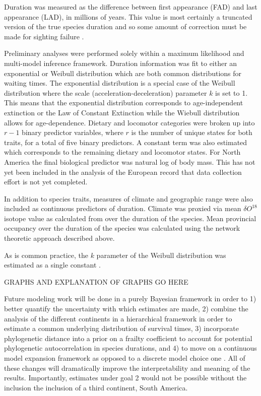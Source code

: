 \documentclass[11pt,letterpaper]{article}
\begin{document}
Duration was measured as the difference between first appearance (FAD) and last appearance (LAD), in millions of years. This value is most certainly a truncated version of the true species duration and so some amount of correction must be made for sighting failure \citep{Alroy2014a,Solow1997,Strauss1989}. %

Preliminary analyses were performed solely within a maximum likelihood and multi-model inference framework. Duration information was fit to either an exponential or Weibull distribution which are both common distributions for waiting times. The exponential distribution is a special case of the Weibull distribution where the scale (acceleration-deceleration) parameter \(k\) is set to 1. This means that the exponential distribution corresponds to age-independent extinction or the Law of Constant Extinction \citep{VanValen1973} while the Wiebull distribution allows for age-dependence. Dietary and locomotor categories were broken up into \(r - 1\) binary predictor variables, where \(r\) is the number of unique states for both traits, for a total of five binary predictors. A constant term was also estimated which corresponds to the remaining dietary and locomotor states. For North America the final biological predictor was natural log of body mass. This has not yet been included in the analysis of the European record that data collection effort is not yet completed. 

In addition to species traits, measures of climate and geographic range were also included as continuous predictors of duration. Climate was proxied via mean \(\delta O^{18}\) isotope value as calculated from \citet{Zachos2008} over the duration of the species. Mean provincial occupancy over the duration of the species was calculated using the network theoretic approach described above.

As is common practice, the \(k\) parameter of the Weibull distribution was estimated as a single constant \citep{Kleinbaum2005}. %

\uppercase{graphs and explanation of graphs go here}

Future modeling work will be done in a purely Bayesian framework in order to 1) better quantify the uncertainty with which estimates are made, 2) combine the analysis of the different continents in a hierarchical framework in order to estimate a common underlying distribution of survival times, 3) incorporate phylogenetic distance into a prior on a frailty coefficient \citep{Banerjee2003a,Ibrahim2001} to account for potential phylogenetic autocorrelation in species durations, and 4) to move on a continuous model expansion framework as opposed to a discrete model choice one \citep{Gelman2013d}. All of these changes will dramatically improve the interpretability and meaning of the results. Importantly, estimates under goal 2 would not be possible without the inclusion the inclusion of a third continent, South America. 
\end{document}
